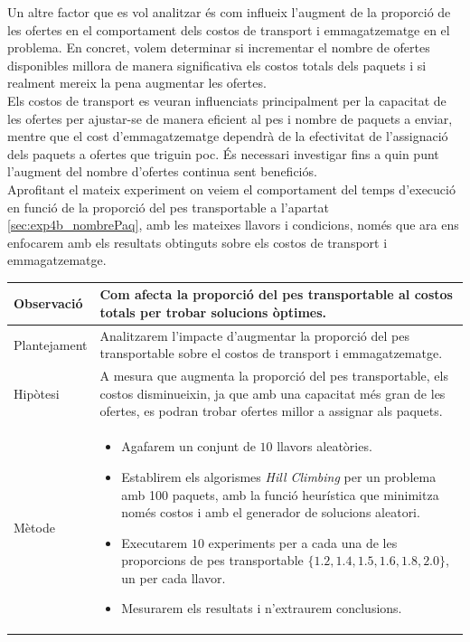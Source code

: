 \documentclass[a4paper]{article}
\begin{document}
	Un altre factor que es vol analitzar és com influeix l'augment de la proporció de les ofertes en el comportament dels costos de transport i emmagatzematge en el problema. En concret, volem determinar si incrementar el nombre de ofertes disponibles millora de manera significativa els costos totals dels paquets i si realment mereix la pena augmentar les ofertes. \\
	
	Els costos de transport es veuran influenciats principalment per la capacitat de les ofertes per ajustar-se de manera eficient al pes i nombre de paquets a enviar, mentre que el cost d'emmagatzematge dependrà de la efectivitat de l'assignació dels paquets a ofertes que triguin poc. És necessari investigar fins a quin punt l'augment del nombre d'ofertes continua sent beneficiós. \\
	
	Aprofitant el mateix experiment on veiem el comportament del temps d'execució en funció de la proporció del pes transportable a l'apartat \ref{sec:exp4b_nombrePaq}, amb les mateixes llavors i condicions, només que ara ens enfocarem amb els resultats obtinguts sobre els costos de transport i emmagatzematge.
	
	\begin{table}[H]
		\centering
		\begin{tabular}{|l|p{10cm}|}
			\hline
			Observació & Com afecta la proporció del pes transportable al costos totals per trobar solucions òptimes.\\
			\hline
			Plantejament & Analitzarem l'impacte d'augmentar la proporció del pes transportable sobre el costos de transport i emmagatzematge. \\
			\hline
			Hipòtesi & A mesura que augmenta la proporció del pes transportable, els costos disminueixin, ja que amb una capacitat més gran de les ofertes, es podran trobar ofertes millor a assignar als paquets.\\
			\hline
			Mètode &
			\begin{itemize}
				\item Agafarem un conjunt de $10$ llavors aleatòries.
				\item Establirem els algorismes \textit{Hill Climbing} per un problema amb 100 paquets, amb la funció heurística que minimitza només costos i amb el generador de solucions aleatori.
				\item Executarem $10$ experiments per a cada una de les proporcions de pes transportable $\{1.2, 1.4, 1.5, 1.6, 1.8, 2.0 \}$, un per cada llavor.
				\item Mesurarem els resultats i n'extraurem conclusions.
			\end{itemize} \\
			\hline
		\end{tabular}
		\label{tab:exp5_apartats}
	\end{table}
	
\end{document}
